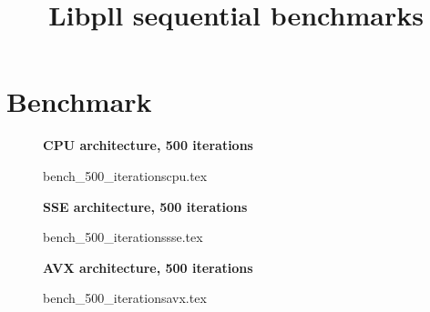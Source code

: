 \documentclass[a4paper]{article}
\begin{document}
\newcommand*{\figuretitle}[1]{%
    {\centering%
    \textbf{#1}%
    \par\medskip}%
}


\title{Libpll sequential benchmarks}
\maketitle



\section{Benchmark}


\begin{figure}[!htb]
\figuretitle{CPU architecture, 500 iterations}
{bench_500_iterationscpu.tex}
\end{figure}
\begin{figure}[!htb]
\figuretitle{SSE architecture, 500 iterations}
{bench_500_iterationssse.tex}
\end{figure}
\begin{figure}[!htb]
\figuretitle{AVX architecture, 500 iterations}
{bench_500_iterationsavx.tex}
\end{figure}


\end{document}
